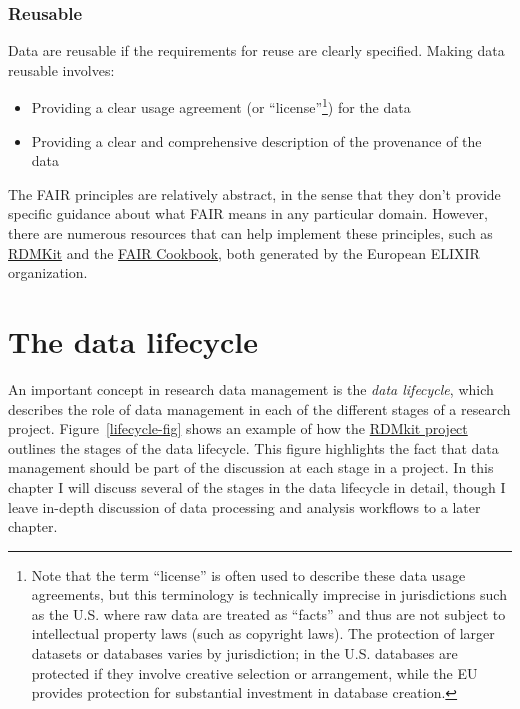 \subsubsection{Reusable}

Data are reusable if the requirements for reuse are clearly specified.  Making data reusable involves:

\begin{itemize}
\item Providing a clear usage agreement (or ``license''\footnote{Note that the term ``license'' is often used to describe these data usage agreements, but this terminology is technically imprecise in jurisdictions such as the U.S. where raw data are treated as ``facts'' and thus are not subject to intellectual property laws (such as copyright laws).  The protection of larger datasets or databases varies by jurisdiction; in the U.S. databases are protected if they involve creative selection or arrangement, while the EU provides protection for substantial investment in database creation.}) for the data
\item Providing a clear and comprehensive description of the provenance of the data
\end{itemize}

The FAIR principles are relatively abstract, in the sense that they don't provide specific guidance about what FAIR means in any particular domain.  However, there are numerous resources that can help implement these principles, such as \href{https://rdmkit.elixir-europe.org/}{RDMKit} and the \href{https://faircookbook.elixir-europe.org/content/home.html}{FAIR Cookbook}, both generated by the European ELIXIR organization.

\section{The data lifecycle}

An important concept in research data management is the \textit{data lifecycle}, which describes the role of data management in each of the different stages of a research project.  Figure~\ref{lifecycle-fig} shows an example of how the \href{https://rdmkit.elixir-europe.org/data\_life\_cycle}{RDMkit project} outlines the stages of the data lifecycle. This figure highlights the fact that data management should be part of the discussion at each stage in a project.  In this chapter I will discuss several of the stages in the data lifecycle in detail, though I leave in-depth discussion of data processing and analysis workflows to a later chapter.

